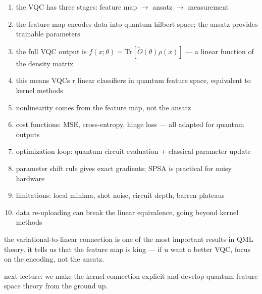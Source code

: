 \documentclass[11pt,a4paper]{article}
\theoremstyle{definition}
\theoremstyle{remark}
\begin{document}
\begin{enumerate}
    \item the VQC has three stages: feature map $\to$ ansatz $\to$ measurement
    \item the feature map encodes data into quantum hilbert space; the ansatz provides trainable parameters
    \item the full VQC output is $f(x;\theta) = \text{Tr}[\tilde{O}(\theta)\rho(x)]$ --- a linear function of the density matrix
    \item this means VQCs r linear classifiers in quantum feature space, equivalent to kernel methods
    \item nonlinearity comes from the feature map, not the ansatz
    \item cost functions: MSE, cross-entropy, hinge loss --- all adapted for quantum outputs
    \item optimization loop: quantum circuit evaluation + classical parameter update
    \item parameter shift rule gives exact gradients; SPSA is practical for noisy hardware
    \item limitations: local minima, shot noise, circuit depth, barren plateaus
    \item data re-uploading can break the linear equivalence, going beyond kernel methods
\end{enumerate}

the variational-to-linear connection is one of the most important results in QML theory. it tells us that the feature map is king --- if u want a better VQC, focus on the encoding, not the ansatz.

next lecture: we make the kernel connection explicit and develop quantum feature space theory from the ground up.
\end{document}
